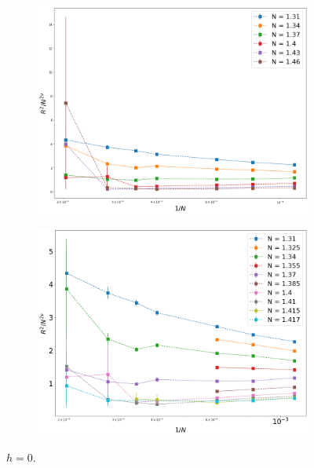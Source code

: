  \begin{figure}[H]
	\centering
	\captionsetup{justification=centering}
	\begin{subfigure}[b]{0.45\textwidth}
		\includegraphics[width=\textwidth]{Images/rscaling_longchainscross.png}
		\caption{  }
		\label{fig:Rscaled_wide}
	\end{subfigure}
	\begin{subfigure}[b]{0.45\textwidth}
		\includegraphics[width=\textwidth]{Images/rscaling_longchainscross_deep.png}
		\caption{  }
		\label{fig:Rscaled_narrow}
	\end{subfigure}
	\caption{$h=0$.    }
	\label{fig:Rscaled}
\end{figure}


